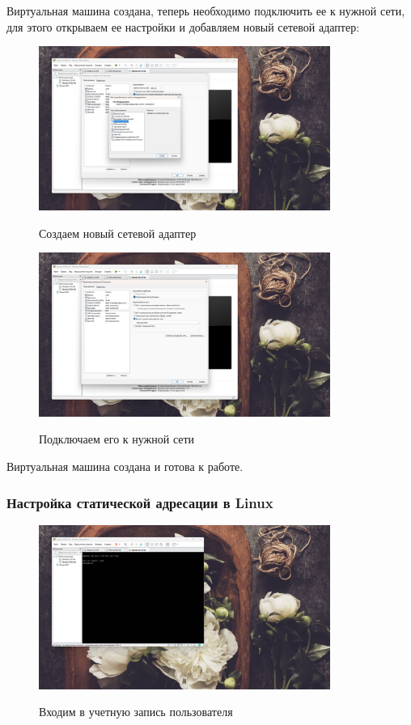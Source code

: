 \documentclass[a4paper]{article}
\begin{document}
  Виртуальная машина создана, теперь необходимо подключить ее к нужной сети,
  для этого открываем ее настройки и добавляем новый сетевой адаптер:

  \begin{figure}[H]
    \centering
    \includegraphics[width=0.85\textwidth]{06_00 (29)}
    \label{img:29}
    \caption{Создаем новый сетевой адаптер}
  \end{figure}
  
  \begin{figure}[H]
    \centering
    \includegraphics[width=0.85\textwidth]{06_00 (30)}
    \label{img:30}
    \caption{Подключаем его к нужной сети}
  \end{figure}

  Виртуальная машина создана и готова к работе.

  \subsubsection{Настройка статической адресации в Linux}
  
  \begin{figure}[H]
    \centering
    \includegraphics[width=0.85\textwidth]{06_00 (31)}
    \label{img:31}
    \caption{Входим в учетную запись пользователя}
  \end{figure}
  
\end{document}
